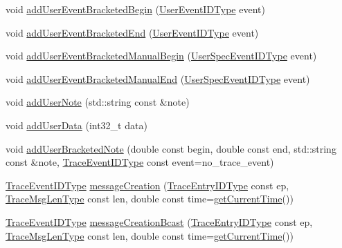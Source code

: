 \begin{DoxyCompactItemize}
\item 
void \hyperlink{structvt_1_1trace_1_1_trace_a1264ea508298bfeb6a6ef5e06d9214f9}{add\+User\+Event\+Bracketed\+Begin} (\hyperlink{namespacevt_1_1trace_a5908920d051c144c89f17c69ed262350}{User\+Event\+I\+D\+Type} event)
\item 
void \hyperlink{structvt_1_1trace_1_1_trace_a9ed44cd0fb5939013ae30de2aeb8aa0e}{add\+User\+Event\+Bracketed\+End} (\hyperlink{namespacevt_1_1trace_a5908920d051c144c89f17c69ed262350}{User\+Event\+I\+D\+Type} event)
\item 
void \hyperlink{structvt_1_1trace_1_1_trace_ab6def24560e35a011beb771b2a05894c}{add\+User\+Event\+Bracketed\+Manual\+Begin} (\hyperlink{namespacevt_1_1trace_a70c43e0e1596eea236912d4197d3120a}{User\+Spec\+Event\+I\+D\+Type} event)
\item 
void \hyperlink{structvt_1_1trace_1_1_trace_a5de97038ac60bfcdf868c3f32637ef9e}{add\+User\+Event\+Bracketed\+Manual\+End} (\hyperlink{namespacevt_1_1trace_a70c43e0e1596eea236912d4197d3120a}{User\+Spec\+Event\+I\+D\+Type} event)
\item 
void \hyperlink{structvt_1_1trace_1_1_trace_a8be5309a84a6d0f99df0eb835fedf3b1}{add\+User\+Note} (std\+::string const \&note)
\item 
void \hyperlink{structvt_1_1trace_1_1_trace_a7f5ede52aa552c2eac88b894853a2efe}{add\+User\+Data} (int32\+\_\+t data)
\item 
void \hyperlink{structvt_1_1trace_1_1_trace_acb4416918d08379892bcf9ec85621309}{add\+User\+Bracketed\+Note} (double const begin, double const end, std\+::string const \&note, \hyperlink{namespacevt_1_1trace_a64a7185f3e102df8d8258f263ccd1582}{Trace\+Event\+I\+D\+Type} const event=no\+\_\+trace\+\_\+event)
\item 
\hyperlink{namespacevt_1_1trace_a64a7185f3e102df8d8258f263ccd1582}{Trace\+Event\+I\+D\+Type} \hyperlink{structvt_1_1trace_1_1_trace_a5b5091197568d7ed104bb40d68b4ddd7}{message\+Creation} (\hyperlink{namespacevt_1_1trace_a3c14050715ba9eceaeff51fb3de64f2f}{Trace\+Entry\+I\+D\+Type} const ep, \hyperlink{namespacevt_1_1trace_aeb598f45d67d41db7902e494f2f0ce59}{Trace\+Msg\+Len\+Type} const len, double const time=\hyperlink{structvt_1_1trace_1_1_trace_a04cf6b76b4ced1bc90d246a34c948db5}{get\+Current\+Time}())
\item 
\hyperlink{namespacevt_1_1trace_a64a7185f3e102df8d8258f263ccd1582}{Trace\+Event\+I\+D\+Type} \hyperlink{structvt_1_1trace_1_1_trace_ad034b14649101fb530eccfb4e2b958ce}{message\+Creation\+Bcast} (\hyperlink{namespacevt_1_1trace_a3c14050715ba9eceaeff51fb3de64f2f}{Trace\+Entry\+I\+D\+Type} const ep, \hyperlink{namespacevt_1_1trace_aeb598f45d67d41db7902e494f2f0ce59}{Trace\+Msg\+Len\+Type} const len, double const time=\hyperlink{structvt_1_1trace_1_1_trace_a04cf6b76b4ced1bc90d246a34c948db5}{get\+Current\+Time}())

\end{DoxyCompactItemize}
